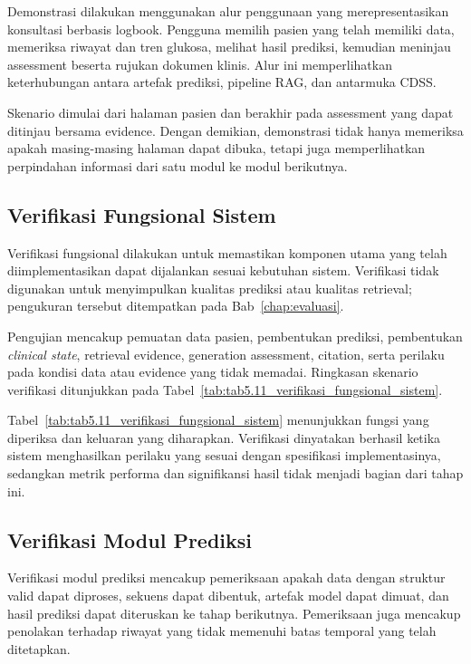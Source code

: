 Demonstrasi dilakukan menggunakan alur penggunaan yang merepresentasikan konsultasi berbasis logbook. Pengguna memilih pasien yang telah memiliki data,
memeriksa riwayat dan tren glukosa, melihat hasil prediksi, kemudian meninjau assessment beserta rujukan dokumen klinis. Alur ini memperlihatkan keterhubungan
antara artefak prediksi, pipeline RAG, dan antarmuka CDSS.

Skenario dimulai dari halaman pasien dan berakhir pada assessment yang dapat ditinjau bersama evidence. Dengan demikian, demonstrasi tidak hanya memeriksa apakah
masing-masing halaman dapat dibuka, tetapi juga memperlihatkan perpindahan informasi dari satu modul ke modul berikutnya.

\subsection{Verifikasi Fungsional Sistem}
\label{subsec:bab5-verifikasi-fungsional-sistem}

Verifikasi fungsional dilakukan untuk memastikan komponen utama yang telah diimplementasikan dapat dijalankan sesuai kebutuhan sistem. Verifikasi tidak
digunakan untuk menyimpulkan kualitas prediksi atau kualitas retrieval; pengukuran tersebut ditempatkan pada Bab~\ref{chap:evaluasi}.

Pengujian mencakup pemuatan data pasien, pembentukan prediksi, pembentukan \textit{clinical state}, retrieval evidence, generation assessment, citation,
serta perilaku pada kondisi data atau evidence yang tidak memadai. Ringkasan skenario verifikasi ditunjukkan pada Tabel~\ref{tab:tab5.11_verifikasi_fungsional_sistem}.



Tabel~\ref{tab:tab5.11_verifikasi_fungsional_sistem} menunjukkan fungsi yang diperiksa dan keluaran yang diharapkan. Verifikasi dinyatakan berhasil ketika
sistem menghasilkan perilaku yang sesuai dengan spesifikasi implementasinya, sedangkan metrik performa dan signifikansi hasil tidak menjadi bagian dari tahap ini.

\subsection{Verifikasi Modul Prediksi}
\label{subsec:bab5-verifikasi-modul-prediksi}

Verifikasi modul prediksi mencakup pemeriksaan apakah data dengan struktur valid dapat diproses, sekuens dapat dibentuk, artefak model dapat dimuat, dan hasil
prediksi dapat diteruskan ke tahap berikutnya. Pemeriksaan juga mencakup penolakan terhadap riwayat yang tidak memenuhi batas temporal yang telah ditetapkan.

